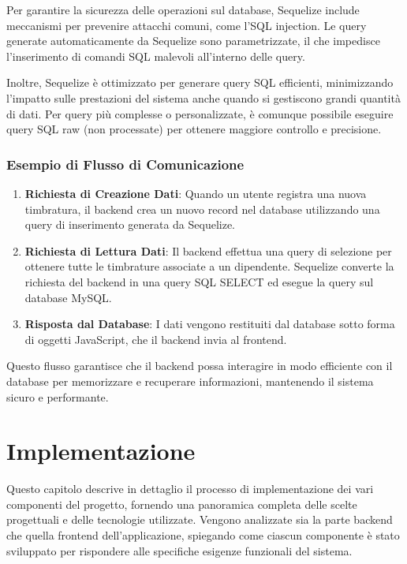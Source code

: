 \documentclass[twoside]{supsistudent}
\begin{document}
Per garantire la sicurezza delle operazioni sul database, Sequelize include meccanismi per prevenire attacchi comuni, come l'SQL injection. Le query generate automaticamente da Sequelize sono parametrizzate, il che impedisce l'inserimento di comandi SQL malevoli all'interno delle query.

Inoltre, Sequelize è ottimizzato per generare query SQL efficienti, minimizzando l'impatto sulle prestazioni del sistema anche quando si gestiscono grandi quantità di dati. Per query più complesse o personalizzate, è comunque possibile eseguire query SQL raw (non processate) per ottenere maggiore controllo e precisione.

\subsection{Esempio di Flusso di Comunicazione}

\begin{enumerate}
  \item \textbf{Richiesta di Creazione Dati}: Quando un utente registra una nuova timbratura, il backend crea un nuovo record nel database utilizzando una query di inserimento generata da Sequelize.

  \item \textbf{Richiesta di Lettura Dati}: Il backend effettua una query di selezione per ottenere tutte le timbrature associate a un dipendente. Sequelize converte la richiesta del backend in una query SQL SELECT ed esegue la query sul database MySQL.

  \item \textbf{Risposta dal Database}: I dati vengono restituiti dal database sotto forma di oggetti JavaScript, che il backend invia al frontend.
\end{enumerate}

Questo flusso garantisce che il backend possa interagire in modo efficiente con il database per memorizzare e recuperare informazioni, mantenendo il sistema sicuro e performante.

\chapter{Implementazione}

Questo capitolo descrive in dettaglio il processo di implementazione dei vari componenti del progetto, fornendo una panoramica completa delle scelte progettuali e delle tecnologie utilizzate. Vengono analizzate sia la parte backend che quella frontend dell'applicazione, spiegando come ciascun componente è stato sviluppato per rispondere alle specifiche esigenze funzionali del sistema.
\end{document}
